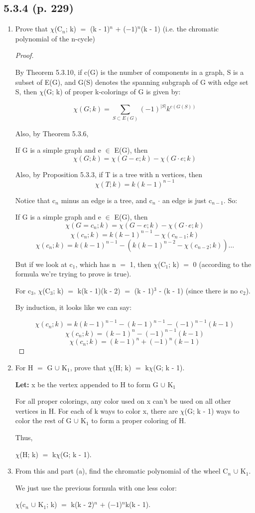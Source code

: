 \documentclass{article}
\newcommand{\mt}[1]{\ensuremath{#1}}
\newcommand\ssc[2][\DefaultOpt]{%
  \def\DefaultOpt{#2}%
  \subsection[#1]{#2}%
}
\newcommand{\bgpf}{\begin{proof} $ $\newline}
\newcommand{\balist}{\begin{enumerate}[label=\alph*.]}
\newcommand{\elist}{\end{enumerate}}
\newcommand{\lt}[1]{\textbf{Let: } #1}
\newcommand{\epf}{\end{proof}}
\newcommand{\mem}{\mt{\in} }
\newcommand{\sbs}{\mt{\subset} }         %
\newcommand{\ps}{\mt{\operatorname{+}} }
\newcommand{\ms}{\mt{\operatorname{-}} }
\newcommand{\eql}{ \mt{\operatorname{=}} }
\newcommand{\uw}[2]{#1\mt{_{#2}}}
\newcommand{\eqn}[1]{\[#1\]}
\newcommand{\unn}{\mt{\cup} }
\begin{document}
\newpage

\ssc{5.3.4 (p. 229)}{

\balist
\item Prove that $\chi$(\uw{C}{n}; k) \eql (k \ms 1)$^n$ \ps ($-1$)$^n$(k \ms 1) (i.e. the chromatic polynomial of the n-cycle)

\bgpf

By Theorem 5.3.10, if c(G) is the number of components in a graph, S is a subset of E(G), and G(S) denotes the spanning subgraph of G with edge set S, then $\chi$(G; k) of proper k-colorings of G is given by:

\eqn{\chi(G; k) = \sum_{S \sbs E(G)} (-1)^{|S|}k^{c(G(S))}}

Also, by Theorem 5.3.6,

If G is a simple graph and e \mem E(G), then
\eqn{\chi(G; k) = \chi(G - e; k) - \chi(G \cdot e; k)}

Also, by Proposition 5.3.3, if T is a tree with n vertices, then
\eqn{\chi(T; k) = k(k - 1)^{n - 1}}

Notice that \uw{c}{n} minus an edge is a tree, and \uw{c}{n} $\cdot$ an edge is just \uw{c}{n - 1}. So:

If G is a simple graph and e \mem E(G), then
\eqn{\chi(G = c_n; k) = \chi(G - e; k) - \chi(G \cdot e; k)}
\eqn{\chi(c_n; k) = k(k - 1)^{n - 1} - \chi(c_{n - 1}; k)}
\eqn{\chi(c_n; k) = k(k - 1)^{n - 1} - (k(k - 1)^{n - 2} - \chi(c_{n - 2}; k))\dots}

But if we look at \uw{c}{1}, which has n \eql 1, then $\chi$(\uw{C}{1}; k) \eql 0 (according to the formula we're trying to prove is true).

For \uw{c}{3}, $\chi$(\uw{C}{3}; k) \eql k(k \ms 1)(k \ms 2) \eql (k \ms 1)$^3$ \ms (k \ms 1) (since there is no \uw{c}{2}).

By induction, it looks like we can say:

\eqn{\chi(c_n; k) = k(k - 1)^{n - 1} - (k - 1)^{n - 1} - (-1)^{n - 1}(k - 1)}
\eqn{\chi(c_n; k) = (k - 1)^n - (-1)^{n-1}(k - 1)}
\eqn{\chi(c_n; k) = (k - 1)^n + (-1)^n(k - 1)}

\epf

\item For H \eql G \unn \uw{K}{1}, prove that $\chi$(H; k) \eql k$\chi$(G; k \ms 1).

\lt{x be the vertex appended to H to form G \unn \uw{K}{1}}

For all proper colorings, any color used on x can't be used on all other vertices in H. For each of k ways to color x, there are $\chi$(G; k \ms 1) ways to color the rest of G \unn \uw{K}{1} to form a proper coloring of H.

Thus,

$\chi$(H; k) \eql k$\chi$(G; k \ms 1).

\item From this and part (a), find the chromatic polynomial of the wheel \uw{C}{n} \unn \uw{K}{1}.

We just use the previous formula with one less color:

$\chi$(\uw{c}{n} \unn \uw{K}{1}; k) \eql k(k \ms 2)$^n$ \ps ($-1$)$^n$k(k \ms 1).
\elist

}
\end{document}
